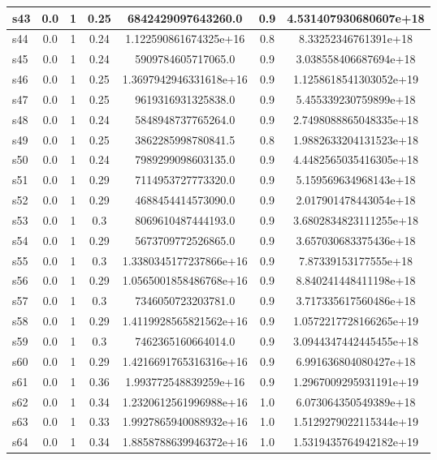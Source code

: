 \documentclass{article}
\begin{document}
\begin{tabular}{|l|c|c|c|c|c|c|}
\hline
s43 &0.0 & 1 & 0.25 & 6842429097643260.0 & 0.9 & 4.531407930680607e+18\\
\hline
s44 &0.0 & 1 & 0.24 & 1.122590861674325e+16 & 0.8 & 8.33252346761391e+18\\
\hline
s45 &0.0 & 1 & 0.24 & 5909784605717065.0 & 0.9 & 3.038558406687694e+18\\
\hline
s46 &0.0 & 1 & 0.25 & 1.3697942946331618e+16 & 0.9 & 1.1258618541303052e+19\\
\hline
s47 &0.0 & 1 & 0.25 & 9619316931325838.0 & 0.9 & 5.455339230759899e+18\\
\hline
s48 &0.0 & 1 & 0.24 & 5848948737765264.0 & 0.9 & 2.7498088865048335e+18\\
\hline
s49 &0.0 & 1 & 0.25 & 3862285998780841.5 & 0.8 & 1.9882633204131523e+18\\
\hline
s50 &0.0 & 1 & 0.24 & 7989299098603135.0 & 0.9 & 4.4482565035416305e+18\\
\hline
s51 &0.0 & 1 & 0.29 & 7114953727773320.0 & 0.9 & 5.159569634968143e+18\\
\hline
s52 &0.0 & 1 & 0.29 & 4688454414573090.0 & 0.9 & 2.017901478443054e+18\\
\hline
s53 &0.0 & 1 & 0.3 & 8069610487444193.0 & 0.9 & 3.6802834823111255e+18\\
\hline
s54 &0.0 & 1 & 0.29 & 5673709772526865.0 & 0.9 & 3.657030683375436e+18\\
\hline
s55 &0.0 & 1 & 0.3 & 1.3380345177237866e+16 & 0.9 & 7.87339153177555e+18\\
\hline
s56 &0.0 & 1 & 0.29 & 1.0565001858486768e+16 & 0.9 & 8.840241448411198e+18\\
\hline
s57 &0.0 & 1 & 0.3 & 7346050723203781.0 & 0.9 & 3.717335617560486e+18\\
\hline
s58 &0.0 & 1 & 0.29 & 1.4119928565821562e+16 & 0.9 & 1.0572217728166265e+19\\
\hline
s59 &0.0 & 1 & 0.3 & 7462365160664014.0 & 0.9 & 3.0944347442445455e+18\\
\hline
s60 &0.0 & 1 & 0.29 & 1.4216691765316316e+16 & 0.9 & 6.991636804080427e+18\\
\hline
s61 &0.0 & 1 & 0.36 & 1.993772548839259e+16 & 0.9 & 1.2967009295931191e+19\\
\hline
s62 &0.0 & 1 & 0.34 & 1.2320612561996988e+16 & 1.0 & 6.073064350549389e+18\\
\hline
s63 &0.0 & 1 & 0.33 & 1.9927865940088932e+16 & 1.0 & 1.5129279022115344e+19\\
\hline
s64 &0.0 & 1 & 0.34 & 1.8858788639946372e+16 & 1.0 & 1.5319435764942182e+19\\

\end{tabular}
\end{document}

